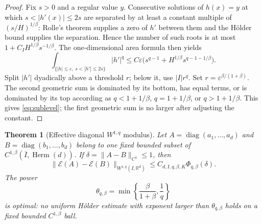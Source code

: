\documentclass[10pt]{article}
\newtheorem{theorem}{Theorem}
\newcommand{\E}{\mathcal E}
\newcommand{\Herm}{\operatorname{Herm}}
\newcommand{\R}{\mathbb R}
\begin{document}
\begin{proof}
Fix $s>0$ and a regular value $y$.  Consecutive solutions of $h(x)=y$
at which $s<|h'(x)|\leq2s$ are separated by at least a constant multiple of
$(s/H)^{1/\beta}$: Rolle's theorem supplies a zero of $h'$ between them and
the H\"older bound supplies the separation.  Hence the number of such roots
is at most $1+C_IH^{1/\beta}s^{-1/\beta}$.  The one-dimensional area formula
then yields
\[
 \int_{\{|h|\leq\varepsilon,\ s<|h'|\leq2s\}}|h'|^q
 \leq C\varepsilon\bigl(s^{q-1}+H^{1/\beta}s^{q-1-1/\beta}\bigr).
\]
Split $|h'|$ dyadically above a threshold $r$; below it, use
$|I|r^q$.  Set $r=\varepsilon^{\beta/(1+\beta)}$.  The second geometric
sum is dominated by its bottom, has equal terms, or is dominated by its top
according as $q<1+1/\beta$, $q=1+1/\beta$, or $q>1+1/\beta$.
This gives \eqref{eq:sublevel}; the first geometric sum is no larger after
adjusting the constant.
\end{proof}

\begin{theorem}[Effective diagonal $W^{1,q}$ modulus]\label{thm:diagonal}
Let
$A=\operatorname{diag}(a_1,\ldots,a_d)$ and
$B=\operatorname{diag}(b_1,\ldots,b_d)$ belong to one fixed bounded subset
of $C^{1,\beta}(\overline I,\Herm(d))$.  If
$\delta=\|A-B\|_{C^1}\leq1$, then
\begin{equation}\label{eq:diagonal}
 \|\E(A)-\E(B)\|_{W^{1,q}(I,\R^d)}
 \leq C_{d,I,q,\beta,K}\Phi_{q,\beta}(\delta).
\end{equation}
The power
\begin{equation}\label{eq:theta}
 \theta_{q,\beta}=\min\left\{\frac\beta{1+\beta},\frac1q\right\}
\end{equation}
is optimal: no uniform H\"older estimate with exponent larger than
$\theta_{q,\beta}$ holds on a fixed bounded $C^{1,\beta}$ ball.
\end{theorem}
\end{document}

